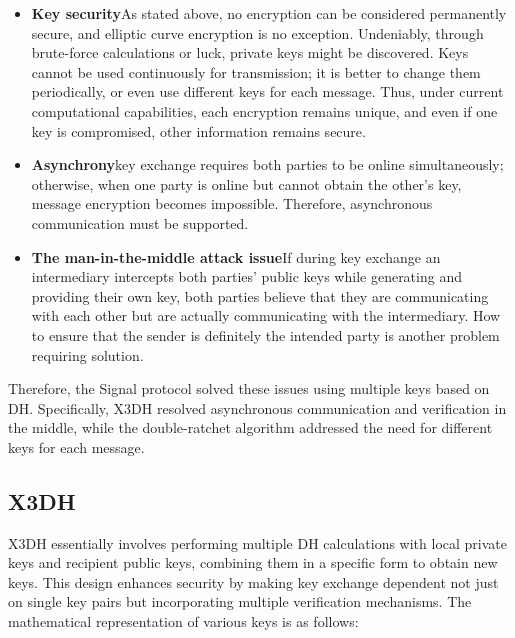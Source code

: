 \documentclass[9pt,a4paper,twoside]{rho-class/rho}
\begin{document}
\begin{itemize}[noitemsep]
    \item \textbf{Key security}\newline As stated above, no encryption can be considered permanently secure, and elliptic curve encryption is no exception. Undeniably, through brute-force calculations or luck, private keys might be discovered. Keys cannot be used continuously for transmission; it is better to change them periodically, or even use different keys for each message. Thus, under current computational capabilities, each encryption remains unique, and even if one key is compromised, other information remains secure. 
    \item \textbf{Asynchrony}\newline key exchange requires both parties to be online simultaneously; otherwise, when one party is online but cannot obtain the other's key, message encryption becomes impossible. Therefore, asynchronous communication must be supported. 
    \item \textbf{The man-in-the-middle attack issue}\newline If during key exchange an intermediary intercepts both parties' public keys while generating and providing their own key, both parties believe that they are communicating with each other but are actually communicating with the intermediary. How to ensure that the sender is definitely the intended party is another problem requiring solution. 
\end{itemize}
Therefore, the Signal protocol solved these issues using multiple keys based on DH. Specifically, X3DH resolved asynchronous communication and verification in the middle, while the double-ratchet algorithm addressed the need for different keys for each message.

\subsection{X3DH}
X3DH essentially involves performing multiple DH calculations with local private keys and recipient public keys, combining them in a specific form to obtain new keys. This design enhances security by making key exchange dependent not just on single key pairs but incorporating multiple verification mechanisms. The mathematical representation of various keys is as follows:
\end{document}
